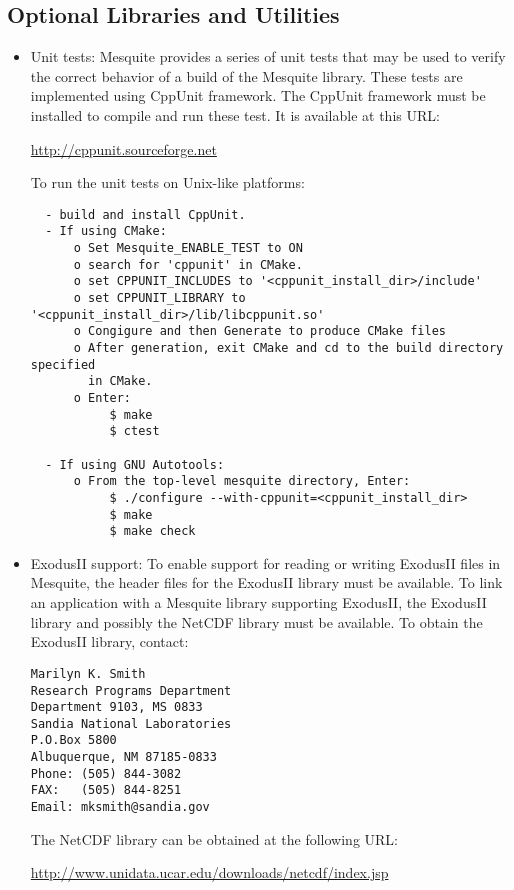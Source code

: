 \subsection{Optional Libraries and Utilities}
\label{sec:depends}
\begin{itemize}
\item Unit tests:  Mesquite provides a series of unit tests that may be used
to verify the correct behavior of a build of the Mesquite library.  These tests
are implemented using CppUnit framework.  The CppUnit framework must be installed
to compile and run these test.  It is available at this URL:
\begin{center}
\url{http://cppunit.sourceforge.net}
\end{center}

To run the unit tests on Unix-like platforms:
\begin{verbatim}
  - build and install CppUnit.
  - If using CMake:
      o Set Mesquite_ENABLE_TEST to ON
      o search for 'cppunit' in CMake.
      o set CPPUNIT_INCLUDES to '<cppunit_install_dir>/include'  
      o set CPPUNIT_LIBRARY to '<cppunit_install_dir>/lib/libcppunit.so' 
      o Congigure and then Generate to produce CMake files
      o After generation, exit CMake and cd to the build directory specified
        in CMake.  
      o Enter:
           $ make
           $ ctest

  - If using GNU Autotools:
      o From the top-level mesquite directory, Enter:
           $ ./configure --with-cppunit=<cppunit_install_dir>
           $ make
           $ make check

\end{verbatim}
\item ExodusII support:  To enable support for reading or writing ExodusII files in Mesquite, the header files for the ExodusII library must be available.  To link an application with a Mesquite library supporting ExodusII, the ExodusII library and possibly the NetCDF library must be available.  To obtain the ExodusII library, contact:
\begin{verbatim}
Marilyn K. Smith
Research Programs Department
Department 9103, MS 0833
Sandia National Laboratories
P.O.Box 5800
Albuquerque, NM 87185-0833
Phone: (505) 844-3082
FAX:   (505) 844-8251
Email: mksmith@sandia.gov
\end{verbatim}
The NetCDF library can be obtained at the following URL:
\begin{center}
\begin{small}\url{http://www.unidata.ucar.edu/downloads/netcdf/index.jsp}\end{small}
\end{center}
\end{itemize}

